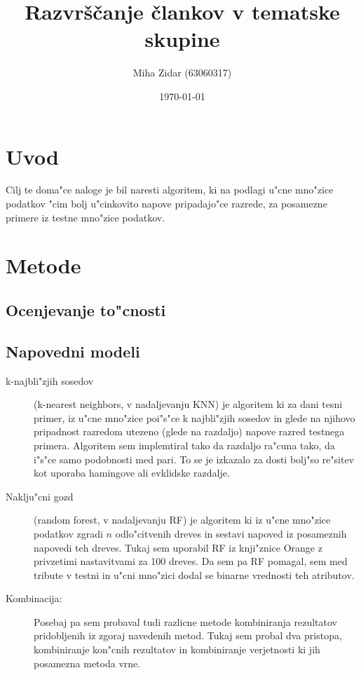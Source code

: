 \documentclass[a4paper,11pt]{article}
\title{Razvrščanje člankov v tematske skupine}
\author{Miha Zidar (63060317)}
\date{\today}
\begin{document}
\maketitle

\section{Uvod}

Cilj te doma"ce naloge je bil naresti algoritem, ki na podlagi u"cne mno"zice podatkov "cim bolj u"cinkovito napove pripadajo"ce razrede, za posamezne primere iz testne mno"zice podatkov.

\section{Metode}

\subsection{Ocenjevanje to"cnosti}



\subsection{Napovedni modeli}

\begin{description}
\item[k-najbli"zjih sosedov] (k-nearest neighbors, v nadaljevanju KNN) je algoritem ki za dani tesni primer, iz u"cne mno"zice poi"s"ce k najbli"zjih sosedov in glede na njihovo pripadnost razredom utezeno (glede na razdaljo) napove razred testnega primera. Algoritem sem implemtiral tako da razdaljo ra"cuna tako, da i"s"ce samo podobnosti med pari. To se je izkazalo za dosti bolj"so re"sitev kot uporaba hamingove ali evklidske razdalje. 

\item[Naklju"cni gozd] (random forest, v nadaljevanju RF) je algoritem ki iz u"cne mno"zice podatkov zgradi $n$ odlo"citvenih dreves in sestavi napoved iz posameznih napovedi teh dreves. Tukaj sem uporabil RF iz knji"znice Orange z privzetimi nastavitvami za 100 dreves. Da sem pa RF pomagal, sem med tribute v testni in u"cni mno"zici dodal se binarne vrednosti teh atributov.

\item[Kombinacija: ] Posebaj pa sem probaval tudi razlicne metode kombiniranja rezultatov pridobljenih iz zgoraj navedenih metod. Tukaj sem probal dva pristopa, kombiniranje kon"cnih rezultatov in kombiniranje verjetnosti ki jih posamezna metoda vrne. 

\end{description}
\end{document}
